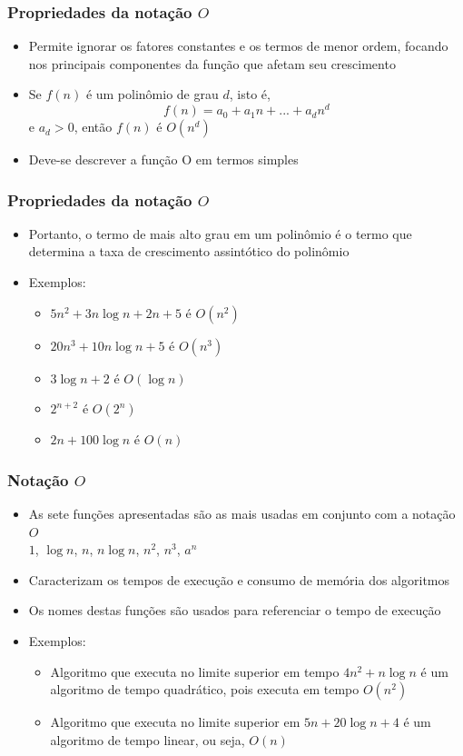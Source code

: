 \documentclass[aspectratio=169]{beamer}
\begin{document}
\begin{frame}\frametitle{Propriedades da notação $O$}
\begin{itemize}
	\item Permite ignorar os fatores constantes e os termos de menor ordem, focando nos principais componentes da função que afetam seu crescimento
	\item Se $f(n)$ é um polinômio de grau $d$, isto é,
\[f(n) = a_0 + a_{1}n + ... + a_{d}n^{d}\]
e $a_d > 0$, então $f(n)$ é $O(n^{d})$
	\item Deve-se descrever a função O em termos simples
\end{itemize}
\end{frame}

\begin{frame}\frametitle{Propriedades da notação $O$}
\begin{itemize}
	\item Portanto, o termo de mais alto grau em um polinômio é o termo que determina a taxa de crescimento assintótico do polinômio
	\item Exemplos:
	\begin{itemize}
		\item $5n^2 + 3n\log{n} + 2n + 5$ é $O(n^2)$
		\item $20n^3 + 10n\log{n} + 5$ é $O(n^3)$
		\item $3\log{n} + 2$ é $O(\log{n})$
		\item $2^{n+2}$ é $O(2^n)$
		\item $2n + 100\log{n}$ é $O(n)$
	\end{itemize}
\end{itemize}
\end{frame}

\begin{frame}\frametitle{Notação $O$}
\begin{itemize}
	\item As sete funções apresentadas são as mais usadas em conjunto com a notação $O$\\
$1$, $\log{n}$, $n$, $n\log{n}$, $n^2$, $n^3$, $a^n$
	\item Caracterizam os tempos de execução e consumo de memória dos algoritmos
	\item Os nomes destas funções são usados para referenciar o tempo de execução
	\item Exemplos:
	\begin{itemize}
		\item  Algoritmo que executa no limite superior em tempo $4n^2 + n\log{n}$ é um algoritmo de tempo quadrático, pois executa em tempo $O(n^2)$
		\item Algoritmo que executa no limite superior em $5n + 20\log{n} + 4$ é um algoritmo de tempo linear, ou seja, $O(n)$
	\end{itemize}
	\end{itemize}
\end{frame}
\end{document}
